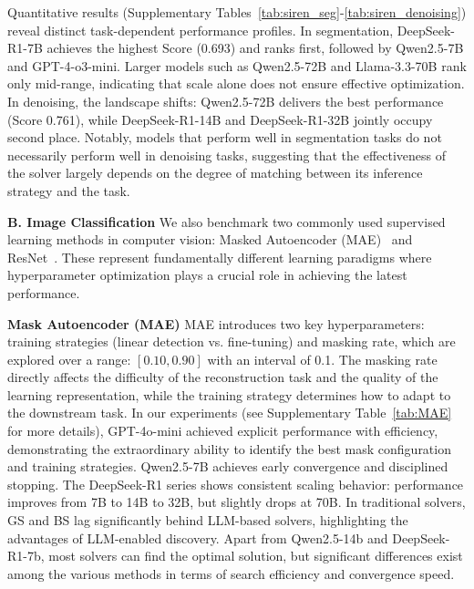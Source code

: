 Quantitative results (Supplementary Tables~\ref{tab:siren_seg}-\ref{tab:siren_denoising}) reveal distinct task-dependent performance profiles. In segmentation, DeepSeek-R1-7B achieves the highest Score (0.693) and ranks first, followed by Qwen2.5-7B and GPT-4-o3-mini. Larger models such as Qwen2.5-72B and Llama-3.3-70B rank only mid-range, indicating that scale alone does not ensure effective optimization. In denoising, the landscape shifts: Qwen2.5-72B delivers the best performance (Score 0.761), while DeepSeek-R1-14B and DeepSeek-R1-32B jointly occupy second place. Notably, models that perform well in segmentation tasks do not necessarily perform well in denoising tasks, suggesting that the effectiveness of the solver largely depends on the degree of matching between its inference strategy and the task.

{\noindent\bf B. Image Classification} We also benchmark two commonly used supervised learning methods in computer vision: Masked Autoencoder (MAE)~\cite{mae} and ResNet~\cite{resnet}. These represent fundamentally different learning paradigms where hyperparameter optimization plays a crucial role in achieving the latest performance.

{\noindent\bf Mask Autoencoder (MAE)} MAE introduces two key hyperparameters: training strategies (linear detection vs. fine-tuning) and masking rate, which are explored over a range: $ [0.10, 0.90] $ with an interval of 0.1. The masking rate directly affects the difficulty of the reconstruction task and the quality of the learning representation, while the training strategy determines how to adapt to the downstream task. In our experiments (see Supplementary Table~\ref{tab:MAE} for more details), GPT-4o-mini achieved explicit performance with efficiency, demonstrating the extraordinary ability to identify the best mask configuration and training strategies. Qwen2.5-7B achieves early convergence and disciplined stopping. The DeepSeek-R1 series shows consistent scaling behavior: performance improves from 7B to 14B to 32B, but slightly drops at 70B. In traditional solvers, GS and BS lag significantly behind LLM-based solvers, highlighting the advantages of LLM-enabled discovery. Apart from Qwen2.5-14b and DeepSeek-R1-7b, most solvers can find the optimal solution, but significant differences exist among the various methods in terms of search efficiency and convergence speed.



